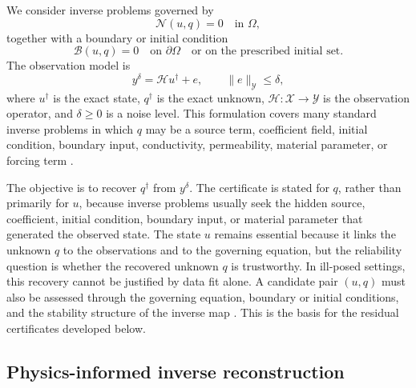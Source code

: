 \documentclass{article}
\numberwithin{equation}{section}
\theoremstyle{definition}
\begin{document}
We consider inverse problems governed by
\begin{equation}
\mathcal N(u,q)=0
\quad \text{in } \Omega,
\label{eq:pde}
\end{equation}
together with a boundary or initial condition
\begin{equation}
\mathcal B(u,q)=0
\quad \text{on } \partial\Omega
\quad \text{or on the prescribed initial set}.
\label{eq:boundary}
\end{equation}
The observation model is
\begin{equation}
y^\delta=\mathcal H u^\dagger+e,
\qquad
\|e\|_{\mathcal Y}\le \delta,
\label{eq:observation}
\end{equation}
where \(u^\dagger\) is the exact state, \(q^\dagger\) is the exact unknown, \(\mathcal H:\mathcal X\to\mathcal Y\) is the observation operator, and \(\delta\ge0\) is a noise level. This formulation covers many standard inverse problems in which \(q\) may be a source term, coefficient field, initial condition, boundary input, conductivity, permeability, material parameter, or forcing term \cite{EnglHankeNeubauer1996,Kirsch2011,KaipioSomersalo2005}.

The objective is to recover \(q^\dagger\) from \(y^\delta\). The certificate is stated for \(q\), rather than primarily for \(u\), because inverse problems usually seek the hidden source, coefficient, initial condition, boundary input, or material parameter that generated the observed state. The state \(u\) remains essential because it links the unknown \(q\) to the observations and to the governing equation, but the reliability question is whether the recovered unknown \(q\) is trustworthy. In ill-posed settings, this recovery cannot be justified by data fit alone. A candidate pair \((u,q)\) must also be assessed through the governing equation, boundary or initial conditions, and the stability structure of the inverse map \cite{TikhonovArsenin1977,EnglHankeNeubauer1996,Hansen2010}. This is the basis for the residual certificates developed below.

\subsection{Physics-informed inverse reconstruction}
\end{document}
